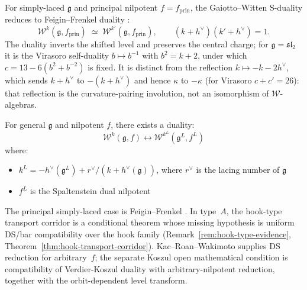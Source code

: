 \begin{theorem}\label{thm:ff-s-duality}
For simply-laced $\mathfrak{g}$ and principal nilpotent $f = f_{\mathrm{prin}}$,
the Gaiotto--Witten S-duality reduces to Feigin--Frenkel duality
\cite{Feigin-Frenkel}:
\[
\mathcal{W}^k(\mathfrak{g}, f_{\mathrm{prin}})
\;\simeq\;
\mathcal{W}^{k'}(\mathfrak{g}, f_{\mathrm{prin}}),
\qquad (k + h^{\vee})(k' + h^{\vee}) = 1.
\]
The duality inverts the shifted level and preserves the central
charge; for $\mathfrak{g} = \mathfrak{sl}_2$ it is the Virasoro
self-duality $b \mapsto b^{-1}$ with $b^{2} = k+2$, under which
$c = 13 - 6(b^{2} + b^{-2})$ is fixed. It is distinct from the
reflection $k \mapsto -k - 2h^{\vee}$, which sends $k + h^{\vee}$ to
$-(k + h^{\vee})$ and hence $\kappa$ to $-\kappa$
(for Virasoro $c + c' = 26$):
that reflection is the curvature-pairing involution, not an
isomorphism of $\mathcal{W}$-algebras.
\end{theorem}

\begin{conjecture}\label{conj:gw-s-duality}
For general $\mathfrak{g}$ and nilpotent $f$, there exists a duality:
\[
\mathcal{W}^k(\mathfrak{g}, f) \longleftrightarrow \mathcal{W}^{k^L}(\mathfrak{g}^L, f^L)
\]
where:
\begin{itemize}
\item $k^L = -h^{\vee}(\mathfrak{g}^L) + r^{\vee}/(k + h^{\vee}(\mathfrak{g}))$, where $r^{\vee}$ is the lacing number of $\mathfrak{g}$
\item $f^L$ is the Spaltenstein dual nilpotent
\end{itemize}
\end{conjecture}

\begin{remark}[Scope]
The principal simply-laced case is Feigin--Frenkel
\cite{Feigin-Frenkel}. In type~$A$, the hook-type transport
corridor is a conditional theorem whose missing hypothesis is
uniform DS/bar compatibility over the hook family
\cite{FehilyHook,CLNS24,CFLN24,GenraStages,ButsonNair,AvE23}
(Remark~\ref{rem:hook-type-evidence},
Theorem~\ref{thm:hook-transport-corridor}). Kac--Roan--Wakimoto
\cite{KRW} supplies DS reduction for arbitrary~$f$; the separate
Koszul open mathematical condition is compatibility of Verdier-Koszul duality
with arbitrary-nilpotent reduction, together with the
orbit-dependent level transform.
\end{remark}

